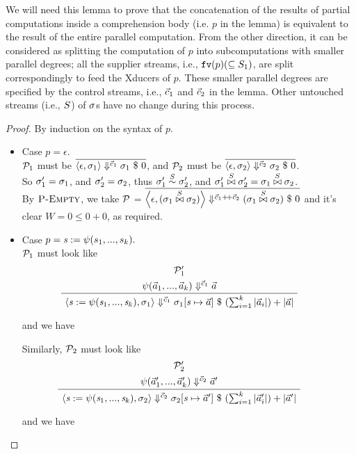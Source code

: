 We will need this lemma to prove that the concatenation of the results of partial computations inside a comprehension body (i.e. $p$ in the lemma) is equivalent to the result of the entire parallel computation. 
From the other direction, it can be considered as splitting the computation of $p$ into subcomputations with smaller parallel degrees; all the supplier streams, i.e., $\FV{p} (\subseteq \S_1)$, are split correspondingly to
feed the Xducers of $p$. 
These smaller parallel degrees are specified by the control streams, i.e., $\c_1$ and $\c_2$ in the lemma. 
Other untouched streams (i.e., $\S$) of $\sgm$s  have no change during this process.\\

\begin{proof}
	By induction on the syntax of $p$.
\def\sgmx{(\sgm_1 \x{\S} \sgm_2)}
\def\sgmpx{(\sgm_1' \x{\S} \sgm_2')}
\def\cc{\c_1 {\++} \c_2}

 
	\begin{itemize}
	\item Case $p = \epsilon$. \\
	$\MP_1$ must be $\overline{\seval{\epsilon}{\sgm_1}{\c_1}{\sgm_1}{0}}$, and
	$\MP_2$ must be $\overline{\seval{\epsilon}{\sgm_2}{\c_2}{\sgm_2}{0}}$. \\
	So $\sgm_1' = \sgm_1$, and $\sgm_2' = \sgm_2$, thus $\sgm_1' \~{\S} \sgm'_2$, and $\sgm_1' \x{\S} \sgm_2' = \sgm_1 \x{\S} \sgm_2$. \\
	
	By $\PName{Empty}$, we take $\MP$ = $\overline{\seval{\epsilon}{\sgmx}{\c_1 {\++} \c_2}{\sgmx}{0}}$ and it's clear $W= 0 \le 0+0$, as required. 
	
\item Case $p = \sdef{\s}{\lcall(s_1,...,s_k)}.$ \\
\def\casetwo{\sdef{\s}{\lcall\Tupk\s}}	
\def\eqnumtwo#1{eq-lem24-c2-{#1}}
	$\MP_1$ must look like 
	$$\PT{\UCN{\MP'_{1}}{\sevalf{\a_1}{\a_k}{\c_1}{\a}}
			\UC{\seval{\sdef{\s}{\lcall\Tupk\s}}{\sgm_1}{\c_1}{\sgm_1[\s \|-> \a]}{(\sum_{i=1}^{k}|\a_i|) + |\a|}}
	} $$

	and we have 
	
	
    Similarly, $\MP_2$ must look like 
	$$\PT{\UCN{\MP'_{2}}{\sevalf{\a_1'}{\a_k'}{\c_2}{\a'}}
		\UC{\seval{\sdef{\s}{\lcall\Tupk\s}}{\sgm_2}{\c_2}{\sgm_2[\s \|-> \a']}{(\sum_{i=1}^{k}|\a'_i|) + |\a'|}}
	} $$
	
	and we have
	

\end{itemize}
\end{proof}

